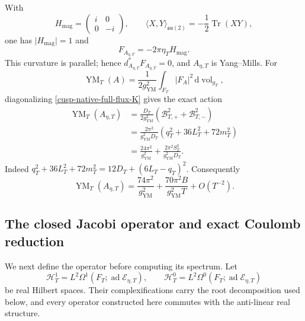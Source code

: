 With
\begin{equation}
 H_{\mathrm{mag}}=\begin{pmatrix}i&0\\0&-i\end{pmatrix},
 \qquad
 \langle X,Y\rangle_{\mathfrak{su}(2)}
 =-\frac12\operatorname{Tr}(XY),
 \label{cusp-native-full-flux-Lie-normalization}
\end{equation}
one has \(\lvert H_{\mathrm{mag}}\rvert=1\) and
\begin{equation}
 F_{A_{\eta,T}}=-2\pi\eta_T H_{\mathrm{mag}}.
 \label{cusp-native-full-flux-SU2-curvature}
\end{equation}
This curvature is parallel; hence
\(d_{A_{\eta,T}}^*F_{A_{\eta,T}}=0\), and \(A_{\eta,T}\) is Yang--Mills.
For
\begin{equation}
 \operatorname{YM}_T(A)=\frac1{2g_{\mathrm{YM}}^2}
 \int_{F_T}|F_A|^2\,\mathrm d\operatorname{vol}_{g_T},
 \label{cusp-native-full-flux-action-normalization}
\end{equation}
diagonalizing \cref{cusp-native-full-flux-K} gives the exact action
\begin{align}
 \operatorname{YM}_T(A_{\eta,T})
 &=\frac{D_T}{2g_{\mathrm{YM}}^2}
   (\mathcal B_{T,+}^2+\mathcal B_{T,-}^2)
 \label{cusp-native-full-flux-action-frequency}\\
 &=\frac{2\pi^2}{g_{\mathrm{YM}}^2D_T}
   (q_T^2+36L_T^2+72m_T^2)
 \label{cusp-native-full-flux-action-coordinate}\\
 &=\frac{24\pi^2}{g_{\mathrm{YM}}^2}
 +\frac{2\pi^2S_T^2}{g_{\mathrm{YM}}^2D_T}.
 \label{cusp-native-full-flux-action-excess}
\end{align}
Indeed
\(q_T^2+36L_T^2+72m_T^2=12D_T+(6L_T-q_T)^2\).
Consequently
\begin{equation}
 \operatorname{YM}_T(A_{\eta,T})
 =\frac{74\pi^2}{g_{\mathrm{YM}}^2}
 +\frac{70\pi^2B}{g_{\mathrm{YM}}^2T}+O(T^{-2}).
 \label{cusp-native-full-flux-action-asymptotic}
\end{equation}

\subsection{The closed Jacobi operator and exact Coulomb reduction}

We next define the operator before computing its spectrum.  Let
\begin{equation}
 \mathscr H_T^1=L^2\Omega^1(F_T;\operatorname{ad}\mathscr E_{\eta,T}),
 \qquad
 \mathscr H_T^0=L^2\Omega^0(F_T;\operatorname{ad}\mathscr E_{\eta,T})
 \label{cusp-native-full-flux-real-Hilbert-spaces}
\end{equation}
be real Hilbert spaces.  Their complexifications carry the root
decomposition used below, and every operator constructed here commutes with
the anti-linear real structure.

